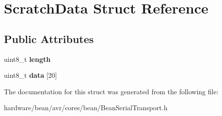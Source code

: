 \hypertarget{struct_scratch_data}{}\section{Scratch\+Data Struct Reference}
\label{struct_scratch_data}
\subsection*{Public Attributes}
\begin{DoxyCompactItemize}
\item 
\hypertarget{struct_scratch_data_a785238c41f24bc3005f822061616d491}{}uint8\+\_\+t {\bfseries length}\label{struct_scratch_data_a785238c41f24bc3005f822061616d491}

\item 
\hypertarget{struct_scratch_data_a8557a4a1a97a9fff67c1eeaee8461541}{}uint8\+\_\+t {\bfseries data} \mbox{[}20\mbox{]}\label{struct_scratch_data_a8557a4a1a97a9fff67c1eeaee8461541}

\end{DoxyCompactItemize}


The documentation for this struct was generated from the following file\+:\begin{DoxyCompactItemize}
\item 
hardware/bean/avr/cores/bean/Bean\+Serial\+Transport.\+h\end{DoxyCompactItemize}

